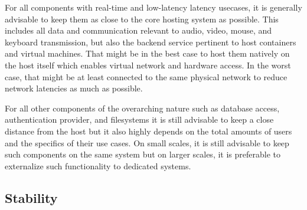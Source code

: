 \documentclass[runningheads]{llncs}
\begin{document}
For all components with real-time and low-latency latency usecases, it is generally advisable
to keep them as close to the core hosting system as possible.
This includes all data and communication
relevant to audio, video, mouse, and keyboard transmission,
but also the backend service pertinent to host containers and virtual machines.
That might be in the best case to host them natively on the host itself
which enables virtual network and hardware access.
In the worst case, that might be at least connected to the same physical network
to reduce network latencies as much as possible.

For all other components of the overarching nature
such as database access, authentication provider, and filesystems
it is still advisable to keep a close distance from the host
but it also highly depends on the total amounts of users
and the specifics of their use cases.
On small scales, it is still advisable to keep such components on the same system
but on larger scales, it is preferable to externalize such functionality to dedicated systems.


\subsection{Stability}
%
\end{document}
